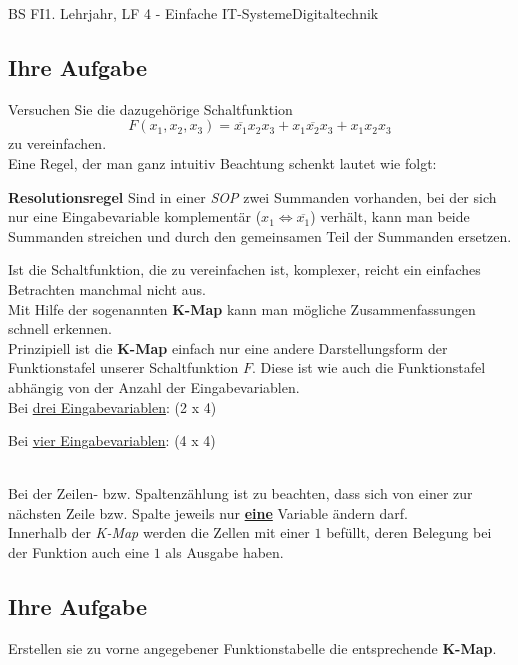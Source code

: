 \documentclass[11pt,twocolumn,oneside,openany,headings=optiontotoc,11pt,numbers=noenddot]{article}
\begin{document}
\begin{worksheet}{BS FI}{1. Lehrjahr, LF 4 - Einfache IT-Systeme}{Digitaltechnik}
		\subsection*{Ihre Aufgabe} Versuchen Sie die dazugehörige Schaltfunktion \[F(x_1,x_2,x_3) = \overline{x_1}x_2x_3 + x_1\overline{x_2}x_3 + x_1x_2x_3\] zu vereinfachen.\\
		Eine Regel, der man ganz intuitiv Beachtung schenkt lautet wie folgt:
		\begin{framed} \textbf{Resolutionsregel} Sind in einer \textit{SOP} zwei Summanden vorhanden, bei der sich nur eine Eingabevariable komplementär (\(x_1 \Leftrightarrow \overline{x_1}\)) verhält, kann man beide Summanden streichen und durch den gemeinsamen Teil der Summanden ersetzen.\end{framed}
		\noindent
		Ist die Schaltfunktion, die zu vereinfachen ist, komplexer, reicht ein einfaches Betrachten manchmal nicht aus.\\
		Mit Hilfe der sogenannten \textbf{K-Map} kann man mögliche Zusammenfassungen schnell erkennen.\\
		Prinzipiell ist die \textbf{K-Map} einfach nur eine andere Darstellungsform der Funktionstafel unserer Schaltfunktion \(F\). Diese ist wie auch die Funktionstafel abhängig von der Anzahl der Eingabevariablen.\\
		\newpage\noindent
		Bei \underline{drei Eingabevariablen}: (2 x 4)\\
		\begin{karnaugh-map}[4][2][1][$x_2x_1$][$x_3$]
			
		\end{karnaugh-map}
		\par\noindent
		Bei \underline{vier Eingabevariablen}: (4 x 4)\\
		\begin{karnaugh-map}[4][4][1][$x_2x_1$][$x_4x_3$]
			
		\end{karnaugh-map}\\
		Bei der Zeilen- bzw. Spaltenzählung ist zu beachten, dass sich von einer zur nächsten Zeile bzw. Spalte jeweils nur \underline{\textbf{eine}} Variable ändern darf.\\
		Innerhalb der \textit{K-Map} werden die Zellen mit einer \(1\) befüllt, deren Belegung bei der Funktion auch eine \(1\) als Ausgabe haben.
		\subsection*{Ihre Aufgabe}	Erstellen sie zu vorne angegebener Funktionstabelle die entsprechende \textbf{K-Map}.
		

\end{worksheet}
\end{document}
